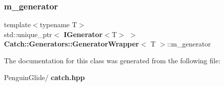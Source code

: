 \subsubsection{m\_generator}
{\footnotesize\ttfamily template$<$typename T$>$ \\
std\+::unique\+\_\+ptr$<$\textbf{ I\+Generator}$<$T$>$ $>$ \textbf{ Catch\+::\+Generators\+::\+Generator\+Wrapper}$<$ T $>$\+::m\+\_\+generator\hspace{0.3cm}{\ttfamily [private]}}



The documentation for this class was generated from the following file\+:\begin{DoxyCompactItemize}
\item 
Penguin\+Glide/\textbf{ catch.\+hpp}\end{DoxyCompactItemize}
